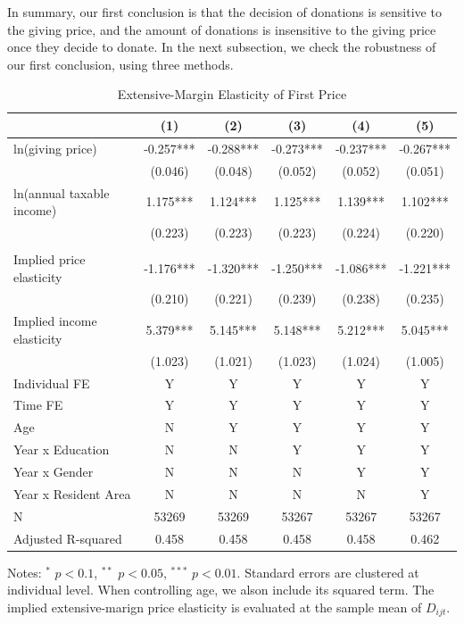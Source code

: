 \documentclass[
  11pt,
  a4paper,
]{article}
\begin{document}
In summary, our first conclusion is that
the decision of donations is sensitive to the giving price,
and the amount of donations is insensitive to the giving price once they decide to donate.
In the next subsection, we check the robustness of our first conclusion, using three methods.

\begin{table}

\caption{\label{tab:MainExtensive}Extensive-Margin Elasticity of First Price}
\centering
\fontsize{9}{11}\selectfont
\begin{threeparttable}
\begin{tabular}[t]{lccccc}
\toprule
 & (1) & (2) & (3) & (4) & (5)\\
\midrule
ln(giving price) & -0.257*** & -0.288*** & -0.273*** & -0.237*** & -0.267***\\
 & (0.046) & (0.048) & (0.052) & (0.052) & (0.051)\\
ln(annual taxable income) & 1.175*** & 1.124*** & 1.125*** & 1.139*** & 1.102***\\
 & (0.223) & (0.223) & (0.223) & (0.224) & (0.220)\\
 &  &  &  &  & \\
Implied price elasticity & -1.176*** & -1.320*** & -1.250*** & -1.086*** & -1.221***\\
 & (0.210) & (0.221) & (0.239) & (0.238) & (0.235)\\
Implied income elasticity & 5.379*** & 5.145*** & 5.148*** & 5.212*** & 5.045***\\
 & (1.023) & (1.021) & (1.023) & (1.024) & (1.005)\\
Individual FE & Y & Y & Y & Y & Y\\
Time FE & Y & Y & Y & Y & Y\\
Age & N & Y & Y & Y & Y\\
Year x Education & N & N & Y & Y & Y\\
Year x Gender & N & N & N & Y & Y\\
Year x Resident Area & N & N & N & N & Y\\
N & 53269 & 53269 & 53267 & 53267 & 53267\\
Adjusted R-squared & 0.458 & 0.458 & 0.458 & 0.458 & 0.462\\
\bottomrule
\end{tabular}
\begin{tablenotes}
\item Notes: $^{*}$ $p < 0.1$, $^{**}$ $p < 0.05$, $^{***}$ $p < 0.01$. Standard errors are clustered at individual level. When controlling age, we alson include its squared term. The implied extensive-marign price elasticity is evaluated at the sample mean of $D_{ijt}$.
\end{tablenotes}
\end{threeparttable}
\end{table}
\end{document}
